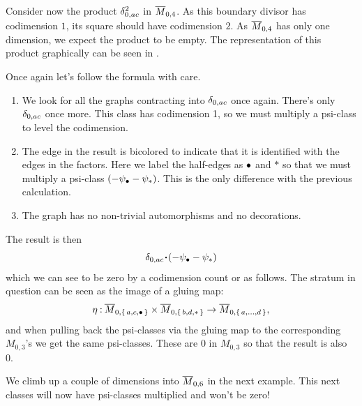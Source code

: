 \documentclass[12pt]{memoir}
\begin{document}
\begin{Ex}
    Consider now the product $\delta_{0,{ac}}^2$ in $\overline{M}_{0,4}$. As this boundary divisor has codimension $1$, its square should have codimension $2$. As $\overline{M}_{0,4}$ has only one dimension, we expect the product to be empty. The representation of this product graphically can be seen in .\par
    Once again let's follow the formula with care.
    \begin{enumerate}
        \item We look for all the graphs contracting into $\delta_{0,{ac}}$ once again. There's only $\delta_{0,{ac}}$ once more. This class has codimension 1, so we must multiply a psi-class to level the codimension.
        \item The edge in the result is bicolored to indicate that it is identified with the edges in the factors. Here we label the half-edges as $\bullet$ and $\ast$ so that we must multiply a psi-class $(-\psi_\bullet-\psi_\ast)$. This is the only difference with the previous calculation.
        \item The graph has no non-trivial automorphisms and no decorations.
    \end{enumerate}
    The result is then 
    $$\dl_{0,{ac}}\.(-\psi_{\8}-\psi_{\ast})$$
    which we can see to be zero by a codimension count or as follows. 
    The stratum in question can be seen as the image of a gluing map:
    $$\eta\mathbin{:}\overline M_{0,\{\,a,c,\bullet\,\}}\times\overline M_{0,\{\,b,d,\ast\,\}}\to\overline M_{0,\{\,a,\dots,d\,\}},$$
    and when pulling back the psi-classes via the gluing map to the corresponding $M_{0,3}$'s we get the same psi-classes. These are $0$ in $M_{0,3}$ so that the result is also 0.
\end{Ex}

We climb up a couple of dimensions into $\overline M_{0,6}$ in the next example. This next classes will now have psi-classes multiplied and won't be zero!
\end{document}
